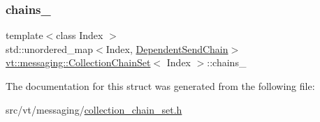 \subsubsection{\texorpdfstring{chains\+\_\+}{chains\_}}
{\footnotesize\ttfamily template$<$class Index $>$ \\
std\+::unordered\+\_\+map$<$Index, \hyperlink{classvt_1_1messaging_1_1_dependent_send_chain}{Dependent\+Send\+Chain}$>$ \hyperlink{classvt_1_1messaging_1_1_collection_chain_set}{vt\+::messaging\+::\+Collection\+Chain\+Set}$<$ Index $>$\+::chains\+\_\+\hspace{0.3cm}{\ttfamily [private]}}



The documentation for this struct was generated from the following file\+:\begin{DoxyCompactItemize}
\item 
src/vt/messaging/\hyperlink{collection__chain__set_8h}{collection\+\_\+chain\+\_\+set.\+h}\end{DoxyCompactItemize}
